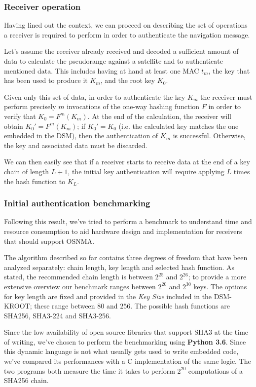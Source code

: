 \subsubsection{Receiver operation}

Having lined out the context, we can proceed on describing the set of operations
a receiver is required to perform in order to authenticate the navigation
message.

Let's assume the receiver already received and decoded a sufficient amount of
data to calculate the pseudorange against a satellite and to authenticate
mentioned data. This includes having at hand at least one MAC $t_m$, the key that
has been used to produce it $K_m$, and the root key $K_0$.

Given only this set of data, in order to authenticate the key $K_m$ the
receiver must perform precisely $m$ invocations of the one-way hashing function
$F$ in order to verify that $K_0 = F^m(K_m)$. At the end of the calculation, the
receiver will obtain $K_0' = F^m(K_m)$; if $K_0' = K_0$ (i.e. the calculated key
matches the one embedded in the DSM), then the authentication of $K_m$ is
successful. Otherwise, the key and associated data must be discarded.

We can then easily see that if a receiver starts to receive data at the end of a
key chain of length $L+1$, the initial key authentication will require applying
$L$ times the hash function to $K_L$.

\subsubsection{Initial authentication benchmarking}

Following this result, we've tried to perform a benchmark to understand time and
resource consumption to aid hardware design and implementation for receivers
that should support OSNMA.

The algorithm described so far contains three degrees of freedom that have been
analyzed separately: chain length, key length and selected hash function. As
stated, the recommended chain length is between $2^{25}$ and $2^{26}$; to
provide a more extensive overview our benchmark ranges between $2^{20}$ and
$2^{30}$ keys. The options for key length are fixed and provided in the
\textit{Key Size} included in the DSM-KROOT; these range between $80$ and $256$.
The possible hash functions are SHA256, SHA3-224 and SHA3-256.

Since the low availability of open source libraries that support SHA3 at the
time of writing, we've chosen to perform the benchmarking using \textbf{Python
3.6}. Since this dynamic language is not what usually gets used to write
embedded code, we've compared its performances with a C implementation of the
same logic. The two programs both measure the time it takes to perform $2^{20}$
computations of a SHA256 chain.

